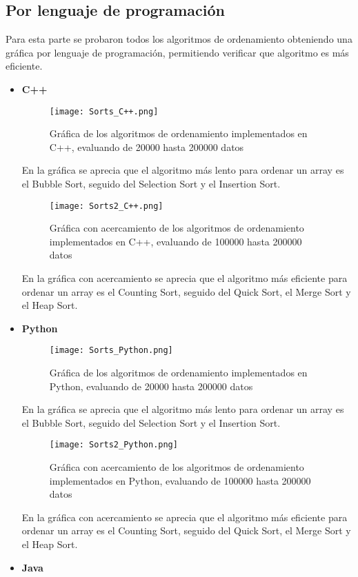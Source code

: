 \subsection*{Por lenguaje de programación}
Para esta parte se probaron todos los algoritmos de ordenamiento obteniendo una gráfica por lenguaje de programación, permitiendo verificar que algoritmo es más eficiente.
\begin{itemize}
    \item \textbf{C++}
        \begin{figure}[H]
	        \centering
	        \texttt{[image: Sorts\_C++.png]}
	        \caption{Gráfica de los algoritmos de ordenamiento implementados en C++, evaluando de 20000 hasta 200000 datos}
		\end{figure}
En la gráfica se aprecia que el algoritmo más lento para ordenar un array es el Bubble Sort, seguido del Selection Sort y el Insertion Sort.
        \begin{figure}[H]
	        \centering
	        \texttt{[image: Sorts2\_C++.png]}
	        \caption{Gráfica con acercamiento de los algoritmos de ordenamiento implementados en C++, evaluando de 100000 hasta 200000 datos}
		\end{figure}
En la gráfica con acercamiento se aprecia que el algoritmo más eficiente para ordenar un array es el Counting Sort, seguido del Quick Sort, el Merge Sort y el Heap Sort.
    \item \textbf{Python}
        \begin{figure}[H]
	        \centering
	        \texttt{[image: Sorts\_Python.png]}
	        \caption{Gráfica de los algoritmos de ordenamiento implementados en Python, evaluando de 20000 hasta 200000 datos}
		\end{figure}
En la gráfica se aprecia que el algoritmo más lento para ordenar un array es el Bubble Sort, seguido del Selection Sort y el Insertion Sort.
        \begin{figure}[H]
	        \centering
	        \texttt{[image: Sorts2\_Python.png]}
	        \caption{Gráfica con acercamiento de los algoritmos de ordenamiento implementados en Python, evaluando de 100000 hasta 200000 datos}
		\end{figure}
En la gráfica con acercamiento se aprecia que el algoritmo más eficiente para ordenar un array es el Counting Sort, seguido del Quick Sort, el Merge Sort y el Heap Sort.
    \item \textbf{Java}
        \begin{figure}[H]

\end{figure}
\end{itemize}
